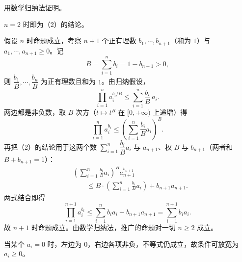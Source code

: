 \begin{answer}
用数学归纳法证明。

$n=2$ 时即为（2）的结论。

假设 $n$ 时命题成立，考察 $n+1$ 个正有理数 $b_1,\cdots,b_{n+1}$（和为 $1$）与 $a_1,\cdots,a_{n+1}\geqslant0$。记
\nopagebreak[4]
\[B=\sum_{i=1}^{n}b_i=1-b_{n+1}>0,\]
则 $\dfrac{b_1}{B},\cdots,\dfrac{b_n}{B}$ 为正有理数且和为 $1$。由归纳假设，
\nopagebreak[4]
\[\prod_{i=1}^{n}a_i^{b_i/B}\leqslant\sum_{i=1}^{n}\frac{b_i}{B}\,a_i.\]
两边都是非负数，取 $B$ 次方（$t\mapsto t^B$ 在 $[0,+\infty)$ 上递增）得
\nopagebreak[4]
\[\prod_{i=1}^{n}a_i^{b_i}\leqslant\left(\sum_{i=1}^{n}\frac{b_i}{B}a_i\right)^{B}.\]
再把（2）的结论用于这两个数 $\sum\limits_{i=1}^{n}\dfrac{b_i}{B}a_i$ 与 $a_{n+1}$、权 $B$ 与 $b_{n+1}$（两者和 $B+b_{n+1}=1$）：
\nopagebreak[4]
\[\begin{aligned}
&\left(\sum_{i=1}^{n}\frac{b_i}{B}a_i\right)^{B}a_{n+1}^{b_{n+1}}\\
&\qquad\leqslant B\cdot\left(\sum_{i=1}^{n}\frac{b_i}{B}a_i\right)+b_{n+1}a_{n+1}.
\end{aligned}\]
两式结合即得
\nopagebreak[4]
\[\prod_{i=1}^{n+1}a_i^{b_i}\leqslant\sum_{i=1}^{n}b_ia_i+b_{n+1}a_{n+1}=\sum_{i=1}^{n+1}b_ia_i.\]
故 $n+1$ 时命题成立。由数学归纳法，推广的命题对一切 $n\geqslant2$ 成立。

当某个 $a_i=0$ 时，左边为 $0$，右边各项非负，不等式仍成立，故条件可放宽为 $a_i\geqslant0$。




\end{answer}